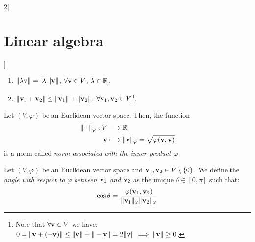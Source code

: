 \documentclass[../../../main.tex]{subfiles}
\begin{document}
\begin{multicols}{2}[\section{Linear algebra}]
\begin{definition}
\begin{enumerate}
      \item $\|\lambda \boldsymbol{\mathrm{v}}\|=|\lambda|\|\boldsymbol{\mathrm{v}}\|$, $\forall \boldsymbol{\mathrm{v}}\in V$, $\lambda\in\mathbb{R}$.
      \item $\|\boldsymbol{\mathrm{v}}_1+\boldsymbol{\mathrm{v}}_2\|\leq\|\boldsymbol{\mathrm{v}}_1\|+\|\boldsymbol{\mathrm{v}}_2\|$, $\forall \boldsymbol{\mathrm{v}}_1,\boldsymbol{\mathrm{v}}_2\in V$\footnote{Note that $\forall\boldsymbol{\mathrm{v}}\in V$ we have: $0=\|\boldsymbol{\mathrm{v}}+(-\boldsymbol{\mathrm{v}})\|\leq\|\boldsymbol{\mathrm{v}}\|+\|-\boldsymbol{\mathrm{v}}\|=2\|\boldsymbol{\mathrm{v}}\|\implies\|\boldsymbol{\mathrm{v}}\|\geq 0$.}.
    \end{enumerate}
  \end{definition}
  \begin{prop}
    Let $(V,\varphi)$ be an Euclidean vector space. Then, the function
    \begin{align*}
      \|\cdot\|_\varphi:V & \longrightarrow\mathbb{R}                                                                              \\
      \boldsymbol{\mathrm{v}}  & \longmapsto\|\boldsymbol{\mathrm{v}}\|_\varphi=\sqrt{\varphi(\boldsymbol{\mathrm{v}},\boldsymbol{\mathrm{v}})}
    \end{align*}
    is a norm called \textit{norm associated with the inner product $\varphi$}.
  \end{prop}
  \begin{definition}
    Let $(V,\varphi)$ be an Euclidean vector space and $\boldsymbol{\mathrm{v}}_1,\boldsymbol{\mathrm{v}}_2\in V\setminus\{0\}$. We define the \textit{angle with respect to $\varphi$ between $\boldsymbol{\mathrm{v}}_1$ and $\boldsymbol{\mathrm{v}}_2$} as the unique $\theta\in[0,\pi]$ such that: $$\cos{\theta}=\frac{\varphi(\boldsymbol{\mathrm{v}}_1,\boldsymbol{\mathrm{v}}_2)}{\|\boldsymbol{\mathrm{v}}_1\|_\varphi\|\boldsymbol{\mathrm{v}}_2\|_\varphi}$$
  \end{definition}

\end{multicols}
\end{document}
